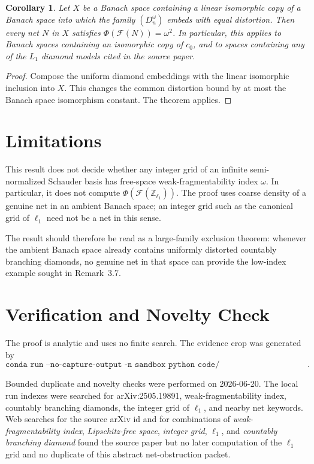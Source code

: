 \documentclass[11pt]{article}
\newtheorem{corollary}{Corollary}
\newcommand{\F}{\mathcal F}
\begin{document}
\begin{corollary}
Let $X$ be a Banach space containing a linear isomorphic copy of a Banach
space into which the family $(D_n^\omega)$ embeds with equal distortion.  Then
every net $N$ in $X$ satisfies $\Phi(\F(N))=\omega^2$.
In particular, this applies to Banach spaces containing an isomorphic copy of
$c_0$, and to spaces containing any of the $L_1$ diamond models cited in
the source paper.
\end{corollary}

\begin{proof}
Compose the uniform diamond embeddings with the linear isomorphic inclusion
into $X$.  This changes the common distortion bound by at most the Banach
space isomorphism constant.  The theorem applies.
\end{proof}

\section*{Limitations}

This result does not decide whether any integer grid of an infinite
semi-normalized Schauder basis has free-space weak-fragmentability index
$\omega$.  In particular, it does not compute $\Phi(\F(\mathbb Z_{\ell_1}))$.
The proof uses coarse density of a genuine net in an ambient Banach space; an
integer grid such as the canonical grid of $\ell_1$ need not be a net in this
sense.

The result should therefore be read as a large-family exclusion theorem:
whenever the ambient Banach space already contains uniformly distorted
countably branching diamonds, no genuine net in that space can provide the
low-index example sought in Remark~3.7.

\section*{Verification and Novelty Check}

The proof is analytic and uses no finite search.  The evidence crop was
generated by
\[
\texttt{conda run --no-capture-output -n sandbox python code/make\_open\_problem\_crop.py}.
\]

Bounded duplicate and novelty checks were performed on 2026-06-20.  The local
run indexes were searched for arXiv:2505.19891, weak-fragmentability index,
countably branching diamonds, the integer grid of $\ell_1$, and nearby net
keywords.  Web searches for the source arXiv id and for combinations of
\emph{weak-fragmentability index}, \emph{Lipschitz-free space},
\emph{integer grid}, $\ell_1$, and \emph{countably branching diamond} found
the source paper but no later computation of the $\ell_1$ grid and no duplicate
of this abstract net-obstruction packet.
\end{document}
